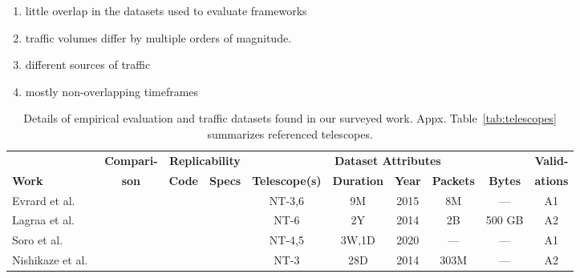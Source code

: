 \documentclass[manuscript,nonacm]{acmart}
\newcommand{\cmark}{\ding{51}}%
\begin{document}
\begin{enumerate}
    \item little overlap in the datasets used to evaluate frameworks
    \item traffic volumes differ by multiple orders of magnitude.
    \item different sources of traffic
    \item mostly non-overlapping timeframes
\end{enumerate}

\begin{table*}[h!]
    \small
    \setlength{\tabcolsep}{4pt}
    \caption{Details of empirical evaluation and traffic datasets found in our surveyed work. Appx. Table~\ref{tab:telescopes} summarizes referenced telescopes.}
    \label{tab:eval}
    \begin{tabular}{@{}lccccccccc@{}}
        \toprule
        & \multicolumn{1}{c}{\textbf{Compari-}} 
        & \multicolumn{2}{c}{\bf Replicability} 
        & \multicolumn{5}{c}{\bf Dataset Attributes} 
        & \multicolumn{1}{c}{\textbf{Valid-}} \\
        \cmidrule(lr){3-4} \cmidrule(lr){5-9}
        \textbf{Work} & \textbf{son} & \textbf{Code} & \textbf{Specs} 
        & \textbf{Telescope(s)} & \textbf{Duration} & \textbf{Year} & \textbf{Packets} & \textbf{Bytes} & \textbf{ations} \\
        \midrule

        Evrard et al.~\cite{2019evrard}
        & 
        &  & 
        & NT-3,6
        & 9M & 2015
        & 8M & ---
        & A1 \\

        Lagraa et al.\textbf{~\cite{2019lagraa}}~\cite{2017lagraa}
        &  
        &  & \cmark
        & NT-6
        & 2Y & 2014
        & 2B & 500 GB
        & A2 \\

        Soro et al.\textbf{~\cite{2020soro}}
        &  
        &  & 
        & NT-4,5
        & 3W,1D & 2020
        & --- & ---
        & A1 \\

        Nishikaze et al.~\cite{2015nishikaze}
        &  
        &  & 
        & NT-3
        & 28D & 2014
        & 303M & ---
        & A2 \\


\end{tabular}
\end{table*}
\end{document}
